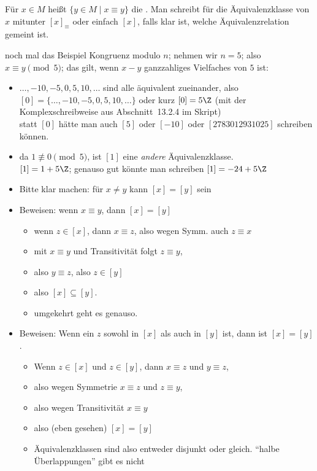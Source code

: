 Für $x\in M$ heißt $\{ y\in M\mid x \equiv y\}$ die
. Man schreibt für die Äquivalenzklasse
von $x$ mitunter $[x]_{\equiv}$ oder einfach $[x]$, falls klar ist,
welche Äquivalenzrelation gemeint ist.

\begin{tutorium}
  noch mal das Beispiel Kongruenz modulo $n$; nehmen wir $n=5$; also
  $x\equiv y \pmod 5$; das gilt, wenn $x-y$ ganzzahliges Vielfaches
  von $5$ ist:
  \begin{itemize}
  \item $\dots, -10, -5, 0, 5, 10, \dots$ sind alle äquivalent zueinander, also\\
    $[0]=\{\dots, -10, -5, 0, 5, 10, \dots\}$ oder kurz $[0]=5\Z$ (mit
    der Komplexschreibweise aus Abschnitt~13.2.4 im Skript)\\
    statt $[0]$ hätte man auch $[5]$ oder $[-10]$ oder
    $[2783012931025]$ schreiben können.
  \item da $1\not\equiv 0 \pmod 5$, ist $[1]$ eine \emph{andere}
    Äquivalenzklasse. \\
    $[1]=1+5\Z$; genauso gut könnte man schreiben $[1]=-24+5\Z$
  \end{itemize}
\end{tutorium}
\begin{tutorium}
  \begin{itemize}
  \item Bitte klar machen: für $x\not= y$ kann $[x]=[y]$ sein
  \item Beweisen: wenn $x\equiv y$, dann $[x]=[y]$
    \begin{itemize}
    \item wenn $z\in [x]$, dann $x\equiv z$, also wegen Symm. auch $z\equiv x$
    \item mit $x\equiv y$ und Transitivität folgt $z\equiv y$,
    \item also $y\equiv z$, also $z\in[y]$
    \item also $[x]\subseteq [y]$.
    \item umgekehrt geht es genauso.
    \end{itemize}
  \item Beweisen: Wenn ein $z$ sowohl in $[x]$ als auch in $[y]$
    ist, dann ist $[x]=[y]$.
    \begin{itemize}
    \item Wenn $z\in[x]$ und $z\in[y]$, dann $x\equiv z$ und
      $y\equiv z$,
    \item also wegen Symmetrie $x\equiv z$ und $z\equiv y$,
    \item also wegen Transitivität $x\equiv y$
    \item also (eben gesehen) $[x]=[y]$
    \item Äquivalenzklassen sind also entweder disjunkt oder
      gleich. "`halbe Überlappungen"' gibt es nicht
    \end{itemize}
  \end{itemize}
\end{tutorium}
